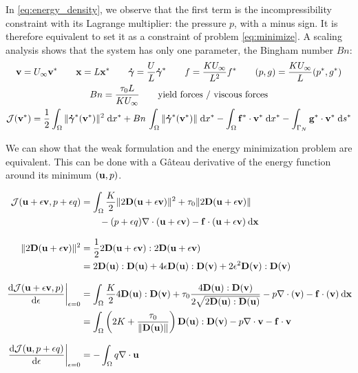 \documentclass[11 pt]{report}
\begin{document}
In \cref{eq:energy_density}, we observe that the first term is the incompressibility constraint with its Lagrange multiplier: the pressure $p$, with a minus sign. It is therefore equivalent to set it as a constraint of problem \eqref{eq:minimize}. A scaling analysis shows that the system has only one parameter, the Bingham number $Bn$:
    \begin{gather}
        \mathbf{v} = U_{\infty}\mathbf{v}^* \qquad \mathbf{x} = L \mathbf{x}^* \qquad \boldsymbol{\dot \gamma} = \frac{U}{L} \boldsymbol{\dot \gamma}^* \qquad f = \frac{K U_{\infty}}{L^2}f^* \qquad (p,g) = \frac{K U_{\infty}}{L}(p^*,g^*)\\
        Bn = \frac{\tau_0 L}{K U_{\infty}} \qquad \text{yield forces / viscous forces}\\
        \mathcal{J}(\mathbf{v}^*) = \frac{1}{2}\int_{\Omega} \|\boldsymbol{\dot \gamma}^*(\mathbf{v}^*)\|^2 \;\dd x^* + Bn \, \int_{\Omega} \|\boldsymbol{\dot \gamma}^*(\mathbf{v}^*)\| \;\dd x^* - \int_{\Omega} \mathbf{f}^*\cdot \mathbf{v}^* \; \dd x^* - \int_{\Gamma_N} \mathbf{g^*} \cdot \mathbf{v}^* \;\dd s^*
    \end{gather}

We can show that the weak formulation and the energy minimization problem are equivalent. This can be done with a Gâteau derivative of the energy function around its minimum $(\mathbf{u}, p)$.

\begin{align}
    \mathcal{J}(\mathbf{u} + \epsilon \mathbf{v}, p+\epsilon q) &= \int_{\Omega} \frac{K}{2} \|2\mathbf{D}(\mathbf{u} + \epsilon \mathbf{v})\|^2 + \tau_0  \|2\mathbf{D}(\mathbf{u} + \epsilon \mathbf{v})\| \\
    &\qquad - (p + \epsilon q) \nabla \cdot (\mathbf{u} + \epsilon \mathbf{v}) - \mathbf{f}\cdot(\mathbf{u} + \epsilon \mathbf{v}) \: \dd \mathbf{x}\\[8pt]
    \|2\mathbf{D}(\mathbf{u} + \epsilon \mathbf{v})\|^2 &= \frac{1}{2} 2\mathbf{D}(\mathbf{u} + \epsilon \mathbf{v}) : 2\mathbf{D}(\mathbf{u} + \epsilon \mathbf{v}) \nonumber \\
    &= 2 \mathbf{D}(\mathbf{u}):\mathbf{D}(\mathbf{u}) + 4\epsilon \mathbf{D}(\mathbf{u}):\mathbf{D}(\mathbf{v}) + 2\epsilon^2 \mathbf{D}(\mathbf{v}):\mathbf{D}(\mathbf{v})\\[8pt]
    \left. \dv{\mathcal{J}(\mathbf{u}+ \epsilon \mathbf{v}, p)}{\epsilon}\right\vert_{\epsilon=0} &= \int_{\Omega} \frac{K}{2}   4\mathbf{D}(\mathbf{u}):\mathbf{D}(\mathbf{v}) + \tau_0 \frac{4\mathbf{D}(\mathbf{u}):\mathbf{D}(\mathbf{v})}{2\sqrt{2\mathbf{D}(\mathbf{u}):\mathbf{D}(\mathbf{u})}} - p\nabla\cdot(\mathbf{v}) - \mathbf{f}\cdot(\mathbf{v}) \: \dd \mathbf{x}\nonumber\\
    &= \int_{\Omega} \left(2K + \frac{\tau_0}{\|\mathbf{D}(\mathbf{u})\|}\right) \mathbf{D}(\mathbf{u}):\mathbf{D}(\mathbf{v}) - p\nabla\cdot \mathbf{v} - \mathbf{f} \cdot \mathbf{v} \label{eq:gateau_1} \\[8pt]
    \left. \dv{\mathcal{J}(\mathbf{u}, p+\epsilon q)}{\epsilon}\right\vert_{\epsilon=0} &= -\int_{\Omega}q \nabla \cdot \mathbf{u}  \label{eq:gateau_2}
\end{align}
\end{document}
